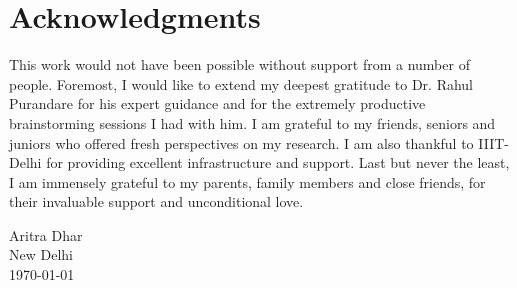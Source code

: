\section*{Acknowledgments}
\label{section:acknowledgments}
\pagestyle{plain}


This work would not have been possible without support from a number of people.
Foremost, I would like to extend my deepest gratitude to Dr. Rahul Purandare for
his expert guidance and for the extremely productive brainstorming sessions I had
with him. I am grateful to my friends, seniors and juniors who offered fresh
perspectives on my research. I am also thankful to IIIT-Delhi for providing
excellent infrastructure and support. Last but never the least, I am immensely
grateful to my parents, family members and close friends, for their invaluable
support and unconditional love.\newline

Aritra Dhar\\
New Delhi\\
\today\\
